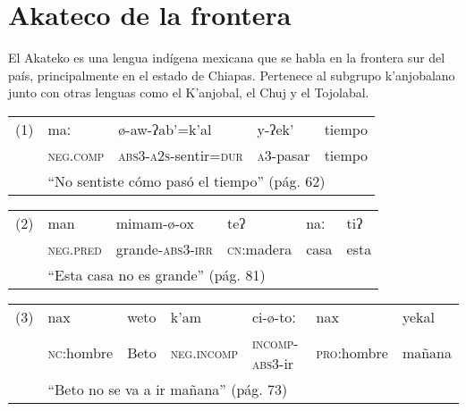\section*{Akateco de la frontera }

\noindent El Akateko es una lengua indígena mexicana que se habla en la frontera sur del país, principalmente en el estado de Chiapas. Pertenece al subgrupo k'anjobalano junto con otras lenguas como el K'anjobal, el Chuj y el Tojolabal. \vspace{0.3cm}


{\noindent \setmainfont{Doulos SIL}
      \begin{tabular}{lllll}
            (1) & maː                                                             & ø-aw-ʔab'=k'al                        & y-ʔek'            & tiempo \\
                & \textsc{neg.comp}                                               & \textsc{abs3-a2s}-sentir\textsc{=dur} & \textsc{a3}-pasar & tiempo \\
                & \multicolumn{4}{l}{“No sentiste cómo pasó el tiempo” (pág. 62)}                                                                      \\
      \end{tabular} \vspace{0.25cm}

      \noindent \begin{tabular}{llllll}
            (2) & man                                                    & mimam-ø-ox               & teʔ                & naː  & tiʔ  \\
                & \textsc{neg.pred}                                      & grande-\textsc{abs3-irr} & \textsc{cn}:madera & casa & esta \\
                & \multicolumn{5}{l}{“Esta casa no es grande” (pág. 81)}                                                               \\
      \end{tabular} \vspace{0.25cm}

      \noindent \begin{tabular}{lllllll}
            (3) & nax                                                       & weto & k'am                & ci-ø-toː                & nax                 & yekal  \\
                & \textsc{nc}:hombre                                        & Beto & \textsc{neg.incomp} & \textsc{incomp-abs3}-ir & \textsc{pro}:hombre & mañana \\
                & \multicolumn{6}{l}{“Beto no se va a ir mañana” (pág. 73)}                                                                                       \\
      \end{tabular} \vspace{0.25cm}

}
